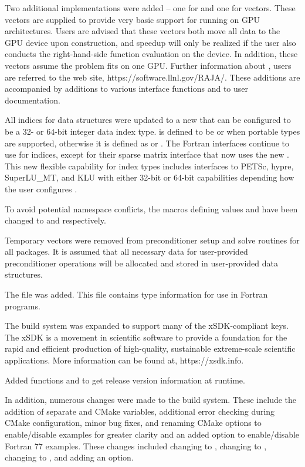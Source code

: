 Two additional {\nvector} implementations were added -- one for
{\cuda} and one for {\raja} vectors.  
These vectors are supplied to provide very basic support for running
on GPU architectures.  Users are advised that these vectors both move all data
to the GPU device upon construction, and speedup will only be realized if the
user also conducts the right-hand-side function evaluation on the device.
In addition, these vectors assume the problem fits on one GPU.
Further information about {\raja}, users are referred to the web site, 
https://software.llnl.gov/RAJA/.
These additions are accompanied by additions to various interface functions
and to user documentation.

All indices for data structures were updated to a new  that
can be configured to be a 32- or 64-bit integer data index type. 
 is defined to be  or  when portable types are
supported, otherwise it is defined as  or .
The Fortran interfaces continue to use  for indices, except for 
their sparse matrix interface that now uses the new .
This new flexible capability for index types includes interfaces to 
PETSc, hypre, SuperLU\_MT, and KLU with 
either 32-bit or 64-bit capabilities depending how the user configures 
{\sundials}.

To avoid potential namespace conflicts, the macros defining 
values  and  have been changed to  and
 respectively.

Temporary vectors were removed from preconditioner setup and solve
routines for all packages.  It is assumed that all necessary data
for user-provided preconditioner operations will be allocated and
stored in user-provided data structures.

The file  was added.  This file contains 
{\sundials} type information for use in Fortran programs.

The build system was expanded to support many of the xSDK-compliant keys. 
The xSDK is a movement in scientific software to provide a foundation for the
rapid and efficient production of high-quality, 
sustainable extreme-scale scientific applications.  More information can
be found at, https://xsdk.info.

Added functions  and  to
get {\sundials} release version information at runtime.

In addition, numerous changes were made to the build system.
These include the addition of separate  and  
CMake variables, additional error checking during CMake configuration,
minor bug fixes, and renaming CMake options to enable/disable examples 
for greater clarity and an added option to enable/disable Fortran 77 examples.
These changes included changing  to , 
changing  to , changing  to 
, and adding an  option.

